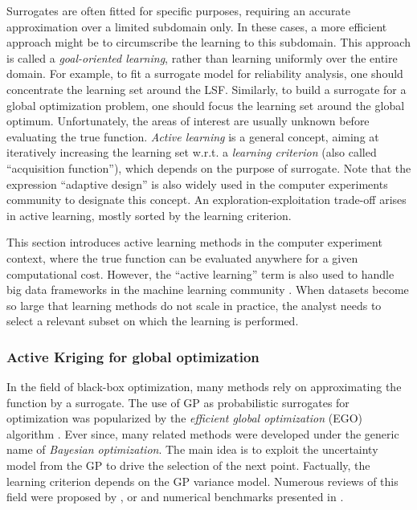 Surrogates are often fitted for specific purposes, requiring an accurate approximation over a limited subdomain only. 
In these cases, a more efficient approach might be to circumscribe the learning to this subdomain. 
This approach is called a \textit{goal-oriented learning}, rather than learning uniformly over the entire domain. 
For example, to fit a surrogate model for reliability analysis, one should concentrate the learning set around the LSF. 
Similarly, to build a surrogate for a global optimization problem, one should focus the learning set around the global optimum. 
Unfortunately, the areas of interest are usually unknown before evaluating the true function. 
\textit{Active learning} is a general concept, aiming at iteratively increasing the learning set w.r.t. a \textit{learning criterion} (also called ``acquisition function''), which depends on the purpose of surrogate. 
Note that the expression ``adaptive design'' is also widely used in the computer experiments community to designate this concept.   
An exploration-exploitation trade-off arises in active learning, mostly sorted by the learning criterion.

\medskip
\begin{remark}
    This section introduces active learning methods in the computer experiment context, where the true function can be evaluated anywhere for a given computational cost. 
    However, the ``active learning'' term is also used to handle big data frameworks in the machine learning community \citep{qiu_2016}. 
    When datasets become so large that learning methods do not scale in practice, the analyst needs to select a relevant subset on which the learning is performed.  
\end{remark}
\medskip

\subsubsection{Active Kriging for global optimization}

In the field of black-box optimization, many methods rely on approximating the function by a surrogate. 
The use of GP as probabilistic surrogates for optimization was popularized by the \textit{efficient global optimization} (EGO) algorithm \citep{jones_1998}. 
Ever since, many related methods were developed under the generic name of \textit{Bayesian optimization}. 
The main idea is to exploit the uncertainty model from the GP to drive the selection of the next point. 
Factually, the learning criterion depends on the GP variance model.  
Numerous reviews of this field were proposed by \citet{shahriari_2015}, or \citet{gramacy_2020_book} and numerical benchmarks presented in \citet{leriche_2021}.

